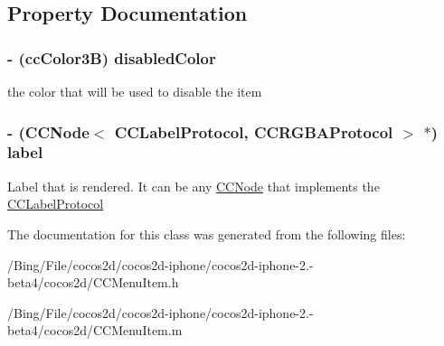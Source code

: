 \subsection{Property Documentation}
\hypertarget{interface_c_c_menu_item_label_a0af349543d90f4c4b64435adacb590a1}{
\subsubsection[{disabled\-Color}]{\setlength{\rightskip}{0pt plus 5cm}-\/ ({\bf cc\-Color3\-B}) {\bf disabled\-Color}}}\label{interface_c_c_menu_item_label_a0af349543d90f4c4b64435adacb590a1}
the color that will be used to disable the item \hypertarget{interface_c_c_menu_item_label_a43df0655d34a4852f9f74efb8d68d0ef}{
\subsubsection[{label}]{\setlength{\rightskip}{0pt plus 5cm}-\/ ({\bf C\-C\-Node}$<$ {\bf C\-C\-Label\-Protocol}, {\bf C\-C\-R\-G\-B\-A\-Protocol} $>$ $\ast$) {\bf label}}}\label{interface_c_c_menu_item_label_a43df0655d34a4852f9f74efb8d68d0ef}
Label that is rendered. It can be any \hyperlink{class_c_c_node}{C\-C\-Node} that implements the \hyperlink{protocol_c_c_label_protocol-p}{C\-C\-Label\-Protocol} 

The documentation for this class was generated from the following files\-:\begin{DoxyCompactItemize}
\item 
/\-Bing/\-File/cocos2d/cocos2d-\/iphone/cocos2d-\/iphone-\/2.-\/beta4/cocos2d/C\-C\-Menu\-Item.\-h\item 
/\-Bing/\-File/cocos2d/cocos2d-\/iphone/cocos2d-\/iphone-\/2.-\/beta4/cocos2d/C\-C\-Menu\-Item.\-m\end{DoxyCompactItemize}
